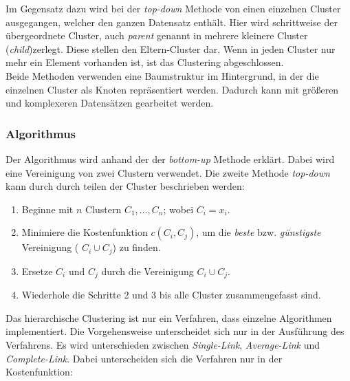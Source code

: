 Im Gegensatz dazu wird bei der \textit{top-down} Methode von einen einzelnen Cluster ausgegangen, welcher den ganzen Datensatz enthält. Hier wird schrittweise der übergeordnete Cluster, auch \textit{parent} genannt in mehrere kleinere Cluster (\textit{child})zerlegt. Diese stellen den Eltern-Cluster dar. Wenn in jeden Cluster nur mehr ein Element vorhanden ist, ist das Clustering abgeschlossen.\\

Beide Methoden verwenden eine Baumstruktur im Hintergrund, in der die einzelnen Cluster als Knoten repräsentiert werden. Dadurch kann mit größeren und komplexeren Datensätzen gearbeitet werden. \cite{jain99, mitch97}

\subsubsection{Algorithmus}

Der Algorithmus wird anhand der der \textit{bottom-up} Methode erklärt. Dabei wird eine Vereinigung von zwei Clustern verwendet. Die zweite Methode \textit{top-down} kann durch durch teilen der Cluster beschrieben werden:\\

\begin{enumerate}
	\item Beginne mit \(n\) Clustern \(C_1,\dotsc,C_n\); wobei \(C_i = x_i\).\\
	
	\item Minimiere die Kostenfunktion \(c(C_i,C_j)\), um die \textsl{beste} bzw. \textsl{günstigste} Vereinigung ( \(C_i \cup C_j\)) zu finden.\\
	
	\item Ersetze \(C_i\) und \(C_j\) durch die Vereinigung \(C_i \cup C_j\).\\
	
	\item Wiederhole die Schritte 2 und 3 bis alle Cluster zusammengefasst sind. \\
	

\end{enumerate}


Das hierarchische Clustering ist nur ein Verfahren, dass einzelne Algorithmen implementiert. Die Vorgehensweise  unterscheidet sich nur in der Ausführung des Verfahrens. Es wird unterschieden zwischen \textit{Single-Link}, \textit{Average-Link} und \textit{Complete-Link}. Dabei unterscheiden sich die Verfahren nur in der Kostenfunktion:\\

